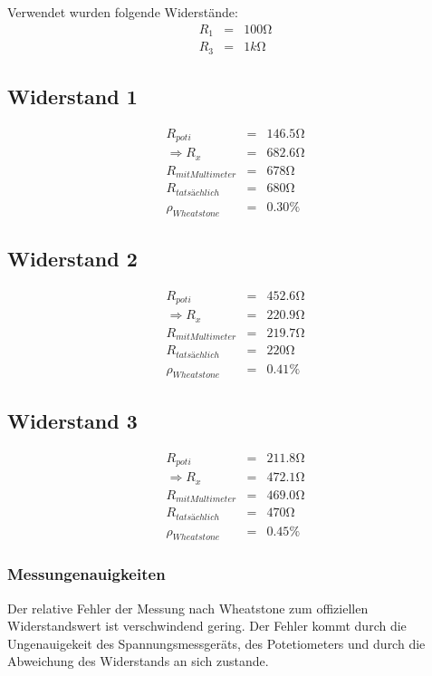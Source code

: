 \documentclass[10pt]{report}
\begin{document}
        Verwendet wurden folgende Widerstände:
        \begin{eqnarray*}
            R_1 &=& 100\si{\ohm}\\
            R_3 &=& 1\si{k\ohm}
        \end{eqnarray*}

        \subsection{Widerstand 1}
        \begin{eqnarray*}
            R_{poti} &=& 146.5 \si{\ohm} \\
            \Rightarrow R_{x} &=& 682.6 \si{\ohm}\\
            R_{mitMultimeter} &=& 678\si{\ohm} \\
			R_{tatsächlich} &=& 680\si{\ohm}\\
			\rho_{Wheatstone} &=& 0.30\%
        \end{eqnarray*}

        \subsection{Widerstand 2}
        \begin{eqnarray*}
            R_{poti} &=& 452.6 \si{\ohm} \\
            \Rightarrow R_{x} &=& 220.9\si{\ohm}\\
            R_{mitMultimeter} &=& 219.7\si{\ohm}\\
			R_{tatsächlich} &=& 220\si{\ohm}\\
			\rho_{Wheatstone} &=& 0.41\%
        \end{eqnarray*}

        \subsection{Widerstand 3}
        \begin{eqnarray*}
            R_{poti} &=& 211.8 \si{\ohm} \\
            \Rightarrow R_{x} &=& 472.1\si{\ohm}\\
            R_{mitMultimeter} &=& 469.0\si{\ohm}\\
			R_{tatsächlich} &=& 470\si{\ohm}\\
			\rho_{Wheatstone} &=& 0.45\%
        \end{eqnarray*}

		\subsubsection{Messungenauigkeiten}
        Der relative Fehler der Messung nach Wheatstone zum offiziellen Widerstandswert
		ist verschwindend gering. Der Fehler kommt durch die Ungenauigekeit des Spannungsmessgeräts,
		des Potetiometers und durch die Abweichung des Widerstands an sich zustande.
		
\end{document}
